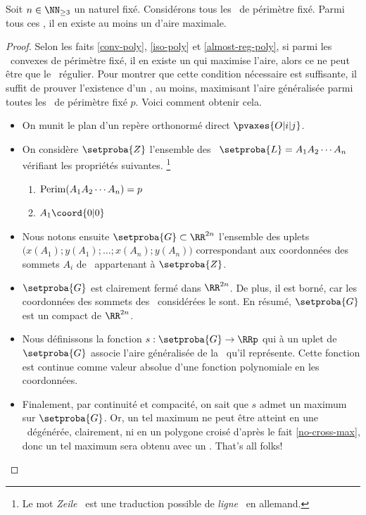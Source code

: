 

\begin{fact} \label{suff-cond}
    Soit $n \in \NN_{\geq3}$ un naturel fixé.
    Considérons tous les \ngones\ de périmètre fixé. Parmi tous ces \ngones, il en existe au moins un d'aire maximale.
\end{fact}


\begin{proof}
    Selon les faits \ref{conv-poly}, \ref{iso-poly} et \ref{almost-reg-poly}, si parmi les \ngones\ convexes de périmètre fixé, il en existe un qui maximise l'aire, alors ce ne peut être que le \ngone\ régulier.
    Pour montrer que cette condition nécessaire est suffisante, il suffit de prouver l'existence d'un \ngone, au moins, maximisant l'aire généralisée parmi toutes les \nlines\ de périmètre fixé $p$. Voici comment obtenir cela.
    \begin{itemize}
        \item On munit le plan d'un repère orthonormé direct $\pvaxes{O | i | j}$. 


        \item On considère $\setproba{Z}$ l'ensemble des \nlines\ $\setproba{L} = A_1 A_2 \cdots A_n$ vérifiant les propriétés suivantes.%
        \footnote{
        	Le mot \og \emph{Zeile} \fg\ est une traduction possible de \og \emph{ligne} \fg\ en allemand.
        }
        \begin{enumerate}
        	\item $\mathrm{Perim}(A_1 A_2 \cdots A_n) = p$

        	\item $A_1\coord{0 | 0}$
        \end{enumerate}


        \item Nous notons ensuite $\setproba{G} \subset \RR^{2n}$ l'ensemble des uplets $\big( x(A_1) ; y(A_1) ; \dots ; x(A_n) ; y(A_n) \big)$ correspondant aux coordonnées des sommets $A_i$ de \nlines\ appartenant à $\setproba{Z}$.
        
        
        \item $\setproba{G}$ est clairement fermé dans $\RR^{2n}$.
        De plus, il est borné, car les coordonnées des sommets des \nlines\ considérées le sont.        
        En résumé, $\setproba{G}$ est un compact de $\RR^{2n}$.


        \item Nous définissons la fonction $s: \setproba{G} \rightarrow \RRp$ qui à un uplet de $\setproba{G}$ associe l'aire généralisée de la \nline\ qu'il représente. 
        Cette fonction est continue comme valeur absolue d'une fonction polynomiale en les coordonnées.
       
        
        \item Finalement, par continuité et compacité, on sait que $s$ admet un maximum sur $\setproba{G}$.
        Or, un tel maximum ne peut être atteint en une \kline\ dégénérée, clairement, ni en un polygone croisé d'après le fait \ref{no-cross-max}, donc un tel maximum sera obtenu avec un \ngone. That's all folks!
    \end{itemize}    
\end{proof}


